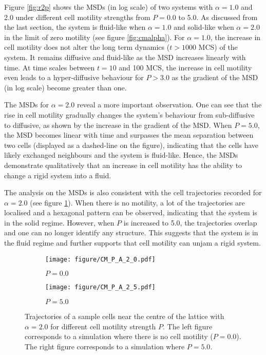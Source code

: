 \documentclass[a4paper,12pt]{article}
\begin{document}
Figure \ref{fig:r2p} shows the MSDs (in log scale) of two systems with $\alpha = 1.0$ and 2.0 under different cell motility strengths from $P = 0.0$ to 5.0. As discussed from the last section, the system is fluid-like when $\alpha = 1.0$ and solid-like when $\alpha = 2.0$ in the limit of zero motility (see figure \ref{fig:cmalpha}). For $\alpha  = 1.0$, the increase in cell motility does not alter the long term dynamics ($t > 1000$ MCS) of the system. It remains diffusive and fluid-like as the MSD increases linearly with time. At time scales between $t = 10$ and 100 MCS, the increase in cell motility even leads to a hyper-diffusive behaviour for $P > 3.0$ as the gradient of the MSD (in log scale) become greater than one. 

The MSDs for $\alpha = 2.0$ reveal a more important observation. One can see that the rise in cell motility gradually changes the system's behaviour from sub-diffusive to diffusive, as shown by the increase in the gradient of the MSD. When $P = 5.0$, the MSD becomes linear with time and surpasses the mean separation between two cells (displayed as a dashed-line on the figure), indicating that the cells have likely exchanged neighbours and the system is fluid-like. Hence, the MSDs demonstrate qualitatively that an increase in cell motility has the ability to change a rigid system into a fluid. 

The analysis on the MSDs is also consistent with the cell trajectories recorded for $\alpha = 2.0$ (see figure \ref{fig:cmp}). When there is no motility, a lot of the trajectories are localised and a hexagonal pattern can be observed, indicating that the system is in the solid regime. However, when $P$ is increased to 5.0, the trajectories overlap and one can no longer identify any structure. This suggests that the system is in the fluid regime and further supports that cell motility can unjam a rigid system. 

\begin{figure}[h]
\centering
\begin{subfigure}[h]{0.496\textwidth}
\texttt{[image: figure/CM\_P\_A\_2\_0.pdf]}
\caption*{$P = 0.0$}
\end{subfigure}
\begin{subfigure}[h]{0.496\textwidth}
\texttt{[image: figure/CM\_P\_A\_2\_5.pdf]}
\caption*{$P = 5.0$}
\end{subfigure}
\caption{Trajectories of a sample cells near the centre of the lattice with $\alpha = 2.0$ for different cell motility strength $P$. The left figure corresponds to a simulation where there is no cell motility ($P = 0.0$). The right figure corresponds to a simulation where $P = 5.0$.}
\label{fig:cmp}
\end{figure}
\end{document}
